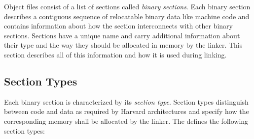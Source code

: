 Object files consist of a list of sections called \emph{binary sections}.
Each binary section describes a contiguous sequence of relocatable binary data like machine code and contains information about how the section interconnects with other binary sections.
Sections have a unique name and carry additional information about their type and the way they should be allocated in memory by the linker.
This section describes all of this information and how it is used during linking.

\subsection{Section Types}\label{sec:objsectiontypes}

Each binary section is characterized by its \emph{section type}.
Section types distinguish between code and data as required by Harvard architectures and specify how the corresponding memory shall be allocated by the linker.
The \ecs{} defines the following section types:

